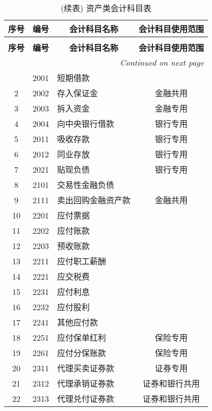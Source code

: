 \documentclass[a4paper]{ctexart}    %
\begin{document}
\begin{center}
    \begin{longtable}{|c|c|p{6cm}|c|}
\caption{负债类会计科目表}\\
\hline
\textbf{序号} & \textbf{编号} & \multicolumn{1}{c|}{\textbf{会计科目名称}} & \textbf{会计科目使用范围} \\
\hline \hline
\endfirsthead
\caption{(续表) 资产类会计科目表}\\
\hline
\textbf{序号} & \textbf{编号} & \multicolumn{1}{c|}{\textbf{会计科目名称}} & \textbf{会计科目使用范围} \\
\hline \hline
\endhead
\hline
\multicolumn{4}{|r|}{\textit{Continued on next page}} \\\hline
\endfoot
\hline
\endlastfoot
1 & 2001 & 短期借款 & \\\hline
2 & 2002 & 存入保证金 & 金融共用 \\\hline
3 & 2003 & 拆入资金 & 金融专用 \\\hline
4 & 2004 & 向中央银行借款 & 银行专用 \\\hline
5 & 2011 & 吸收存款 & 银行专用 \\\hline
6 & 2012 & 同业存放 & 银行专用 \\\hline
7 & 2021 & 贴现负债 & 银行专用 \\\hline
8 & 2101 & 交易性金融负债 &  \\\hline
9 & 2111 & 卖出回购金融资产款 & 金融共用 \\\hline
10 & 2201 & 应付票据 & \\\hline
11 & 2202 & 应付账款 & \\\hline
12 & 2203 & 预收账款 & \\\hline
13 & 2211 & 应付职工薪酬 & \\\hline
14 & 2221 & 应交税费 & \\\hline
15 & 2231 & 应付利息 & \\\hline
16 & 2232 & 应付股利 & \\\hline
17 & 2241 & 其他应付款 & \\\hline
18 & 2251 & 应付保单红利 & 保险专用 \\\hline
19 & 2261 & 应付分保账款 & 保险专用 \\\hline
20 & 2311 & 代理买卖证券款 & 证券专用 \\\hline
21 & 2312 & 代理承销证券款 & 证券和银行共用 \\\hline
22 & 2313 & 代理兑付证券款 & 证券和银行共用 \\\hline

\end{longtable}
\end{center}
\end{document}
